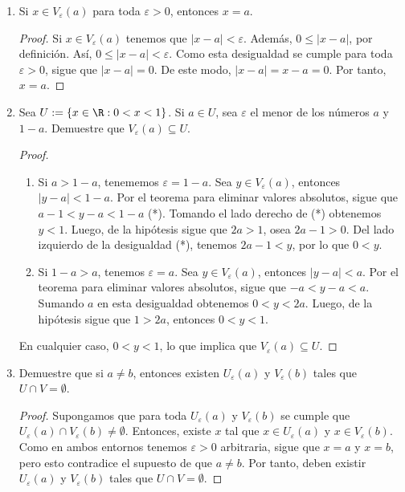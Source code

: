 \begin{enumerate}[label=\alph*)]
 \item Si $x\in V_\varepsilon(a)$ para toda $\varepsilon>0$, entonces $x=a$.
 \begin{proof} 
  Si $x\in V_\varepsilon(a)$ tenemos que $|x-a|<\varepsilon$. Además, $0\leq |x-a|$, por definición. Así, $0\leq |x-a|<\varepsilon$. Como esta desigualdad se cumple para toda $\varepsilon>0$, sigue que $|x-a|=0$. De este modo, $|x-a|=x-a=0$. Por tanto, $x=a$. 
 \end{proof}
 
 \item Sea $U:=\{x\in \R: 0<x<1\}$. Si $a\in U$, sea $\varepsilon$ el menor de los números $a$ y $1-a$. Demuestre que $V_\varepsilon(a) \subseteq U$.
 \begin{proof} \leavevmode
  \begin{enumerate}[label=\roman*)]
   \item Si $a>1-a$, tenememos $\varepsilon=1-a$. Sea $y\in V_\varepsilon(a)$, entonces $|y-a|<1-a$. Por el teorema para eliminar valores absolutos, sigue que $a-1<y-a<1-a$ (*). Tomando el lado derecho de (*) obtenemos $y<1$. Luego, de la hipótesis sigue que $2a>1$, osea $2a-1>0$. Del lado izquierdo de la desigualdad (*), tenemos $2a-1<y$, por lo que $0<y$.
   \item Si $1-a>a$, tenemos $\varepsilon=a$. Sea $y\in V_\varepsilon(a)$, entonces $|y-a|<a$. Por el teorema para eliminar valores absolutos, sigue que $-a<y-a<a$. Sumando $a$ en esta desigualdad obtenemos $0<y<2a$. Luego, de la hipótesis sigue que $1>2a$, entonces $0<y<1$.\end{enumerate}
   En cualquier caso, $0<y<1$, lo que implica que $V_\varepsilon(a) \subseteq U$. 
 \end{proof}

 \item Demuestre que si $a\neq b$, entonces existen $U_\varepsilon(a)$ y $V_\varepsilon(b)$ tales que $U\cap V =\emptyset$.
 \begin{proof} 
  Supongamos que para toda $U_\varepsilon(a)$ y $V_\varepsilon(b)$ se cumple que $U_\varepsilon(a) \cap V_\varepsilon(b) \neq \emptyset$. Entonces, existe $x$ tal que $x\in U_\varepsilon(a)$ y $x\in V_\varepsilon(b)$. Como en ambos entornos tenemos $\varepsilon>0$ arbitraria, sigue que $x=a$ y $x=b$, pero esto contradice el supuesto de que $a\neq b$. Por tanto, deben existir $U_\varepsilon(a)$ y $V_\varepsilon(b)$ tales que $U\cap V =\emptyset$. 
 \end{proof}
\end{enumerate}

